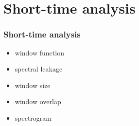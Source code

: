 
\section{Short-time analysis}

\begin{frame}
	\frametitle{Short-time analysis}
	\begin{itemize}
		\item window function
		\item spectral leakage
		\item window size
		\item window overlap
		\item spectrogram
	\end{itemize}
\end{frame}


